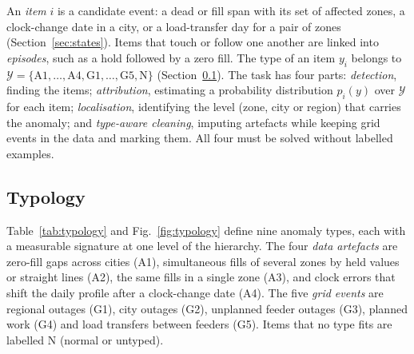 An \emph{item} $i$ is a candidate event: a dead or fill span with its set of affected zones, a clock-change date in a city, or a load-transfer day for a pair of zones (Section~\ref{sec:states}). Items that touch or follow one another are linked into \emph{episodes}, such as a hold followed by a zero fill. The type of an item $y_i$ belongs to $\mathcal{Y} = \{\mathrm{A1},\dots,\mathrm{A4},\mathrm{G1},\dots,\mathrm{G5},\mathrm{N}\}$ (Section~\ref{sec:typology}). The task has four parts: \emph{detection}, finding the items; \emph{attribution}, estimating a probability distribution $p_i(y)$ over $\mathcal{Y}$ for each item; \emph{localisation}, identifying the level (zone, city or region) that carries the anomaly; and \emph{type-aware cleaning}, imputing artefacts while keeping grid events in the data and marking them. All four must be solved without labelled examples.

\subsection{Typology}\label{sec:typology}

Table~\ref{tab:typology} and Fig.~\ref{fig:typology} define nine anomaly types, each with a measurable signature at one level of the hierarchy. The four \emph{data artefacts} are zero-fill gaps across cities (A1), simultaneous fills of several zones by held values or straight lines (A2), the same fills in a single zone (A3), and clock errors that shift the daily profile after a clock-change date (A4). The five \emph{grid events} are regional outages (G1), city outages (G2), unplanned feeder outages (G3), planned work (G4) and load transfers between feeders (G5). Items that no type fits are labelled N (normal or untyped).

